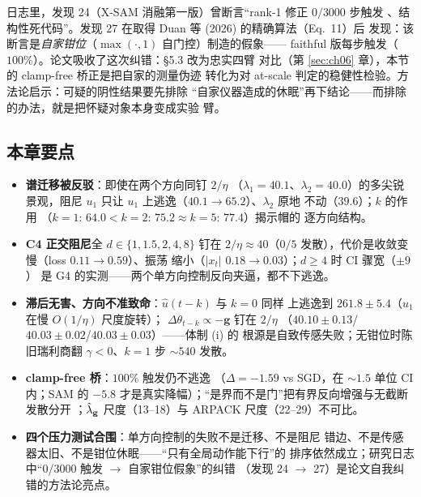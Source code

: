 日志里，发现 24（X-SAM 消融第一版）曾断言``rank-1 修正 $0/3000$ 步触发
、结构性死代码''。发现 27 在取得 Duan 等 (2026) 的精确算法（Eq.~11）后
发现：该断言是\emph{自家钳位}（$\max(\cdot,1)$ 自门控）制造的假象——
faithful 版每步触发（$100\%$）。论文吸收了这次纠错：§5.3 改为忠实四臂
对比（第 \ref{sec:ch06} 章），本节的 clamp-free 桥正是把自家的测量伪迹
转化为对 at-scale 判定的稳健性检验。方法论启示：可疑的阴性结果要先排除
``自家仪器造成的休眠''再下结论——而排除的办法，就是把怀疑对象本身变成实验
臂。

\subsection*{本章要点}
\begin{itemize}
  \item \textbf{谱迁移被反驳}：即使在两个方向同钉 $2/\eta$
        （$\lambda_{1}=40.1$、$\lambda_{2}=40.0$）的多尖锐景观，阻尼
        $u_{1}$ 只让 $u_{1}$ 上逃逸（$40.1\to65.2$）、$\lambda_{2}$ 原地
        不动（$39.6$）；$k$ 的作用
        （$k{=}1{:}\,64.0<k{=}2{:}\,75.2\approx k{=}5{:}\,77.4$）揭示帽的
        逐方向结构。
  \item \textbf{C4 正交阻尼}全 $d\in\{1,1.5,2,4,8\}$ 钉在 $2/\eta\approx
        40$（$0/5$ 发散），代价是收敛变慢（loss $0.11\to0.59$）、振荡
        缩小（$|x_{t}|$ $0.18\to0.03$）；$d\geq4$ 时 CI 骤宽（$\pm9$）
        是 G4 的实测——两个单方向控制反向夹逼，都不下逃逸。
  \item \textbf{滞后无害、方向不准致命}：$\hat u(t-k)$ 与 $k{}=0$ 同样
        上逃逸到 $261.8\pm5.4$（$u_{1}$ 在慢 $O(1/\eta)$ 尺度旋转）；
        $\Delta\theta_{t-k}\propto-\mathbf{g}$ 钉在 $2/\eta$
        （$40.10\pm0.13$/$40.03\pm0.02$/$40.03\pm0.03$）——体制 (i) 的
        根源是自致传感失败；无钳位时陈旧瑞利商翻 $\gamma<0$、$k{=}1$ 步
        $\sim540$ 发散。
  \item \textbf{clamp-free 桥}：$100\%$ 触发仍不逃逸
        （$\Delta=-1.59$ vs SGD，在 $\sim1.5$ 单位 CI 内；SAM 的 $-5.8$
        才是真实降幅）；``是界而不是门''把有界反向增强与无截断发散分开
        ；$\hat{\lambda}_{\mathbf{g}}$ 尺度（13--18）与 ARPACK 尺度（22--29）不可比。
  \item \textbf{四个压力测试合围}：单方向控制的失败不是迁移、不是阻尼
        错边、不是传感器太旧、不是钳位休眠——``只有全局动作能下行''的
        排序依然成立；研究日志中``0/3000 触发 $\to$ 自家钳位假象''的纠错
        （发现 24 $\to$ 27）是论文自我纠错的方法论亮点。
\end{itemize}
